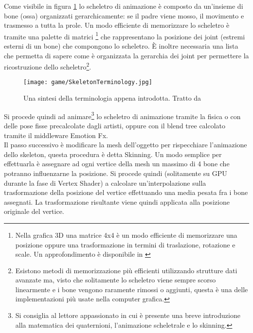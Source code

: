 	Come visibile in figura \ref{fig:SkeletonTerminology} lo scheletro di animazione è composto da un'insieme di bone (ossa) organizzati gerarchicamente: se il padre viene mosso, il movimento e trasmesso a tutta la prole. Un modo efficiente di memorizzare lo scheletro è tramite una palette di matrici \footnote{Nella grafica 3D una matrice 4x4 è un modo efficiente di memorizzare una posizione oppure una trasformazione in termini di traslazione, rotazione e scale. Un approfondimento è disponibile in \cite[chp.~3]{inbook:directx-book}} che rappresentano la posizione dei joint (estremi esterni di un bone) che compongono lo scheletro. È inoltre necessaria una lista che permetta di sapere come è organizzata la gerarchia dei joint per permettere la ricostruzione dello scheletro\footnote{Esistono metodi di memorizzazione più efficienti utilizzando strutture dati avanzate ma, visto che solitamente lo scheletro viene sempre scorso linearmente e i bone vengono raramente rimossi o aggiunti, questa è una delle implementazioni più usate nella computer grafica.}.\\
	
	\begin{figure}[h!] 
		\centering
		\texttt{[image: game/SkeletonTerminology.jpg]}
		\caption{Una sintesi della terminologia appena introdotta. Tratto da \cite{site:skeleton-terminoligy}}
		\label{fig:SkeletonTerminology}
	\end{figure}
	
	
	Si procede quindi ad animare\footnote{Si consiglia al lettore appassionato \cite[chp.~24, 25]{inbook:directx-book} in cui è presente una breve introduzione alla matematica dei quaternioni, l'animazione scheletrale e lo skinning.} lo scheletro di animazione tramite la fisica o con delle pose fisse precalcolate dagli artisti, oppure con il blend tree calcolato tramite il middleware Emotion Fx.\\
	
	Il passo successivo è modificare la mesh dell'oggetto per rispecchiare l'animazione dello skeleton, questa procedura è detta Skinning. Un modo semplice per effettuarla è assegnare ad ogni vertice della mesh un massimo di 4 bone che potranno influenzarne la posizione. Si procede quindi (solitamente su GPU durante la fase di Vertex Shader) a calcolare un'interpolazione sulla trasformazione della posizione del vertice effettuando una media pesata fra i bone assegnati. La trasformazione risultante viene quindi applicata alla posizione originale del vertice.\\
	
